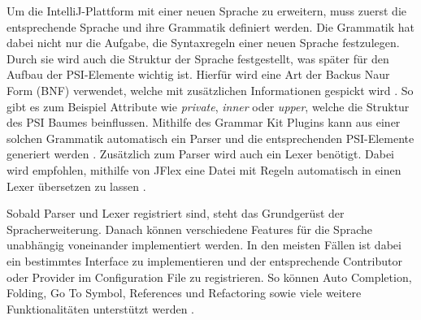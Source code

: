   Um die IntelliJ-Plattform mit einer neuen Sprache zu erweitern, muss zuerst die entsprechende
  Sprache und ihre Grammatik definiert werden. Die Grammatik hat dabei nicht nur die Aufgabe, die 
  Syntaxregeln einer neuen Sprache festzulegen. Durch sie wird auch die Struktur der Sprache festgestellt,
  was später für den Aufbau der PSI-Elemente wichtig ist. Hierfür wird eine Art der Backus Naur Form (BNF)
  verwendet, welche mit zusätzlichen Informationen gespickt wird \cite{mccracken2003backus,GrammarKit}. 
  So gibt es zum Beispiel Attribute
  wie \emph{private}, \emph{inner} oder \emph{upper}, welche die Struktur des PSI Baumes beinflussen. Mithilfe des Grammar Kit Plugins
  kann aus einer solchen Grammatik automatisch ein Parser und die entsprechenden PSI-Elemente generiert werden
  \cite{IntelliJPlatformSDKLanguageTutorialGrammar}. 
  Zusätzlich zum Parser wird auch ein Lexer benötigt. Dabei wird empfohlen, mithilfe von JFlex
  eine Datei mit Regeln automatisch in einen Lexer übersetzen zu lassen 
  \cite{JFlex,KleinJFlexManual,IntelliJPlatformSDKLanguageTutorialLexer}.

  Sobald Parser und Lexer registriert sind, steht das Grundgerüst der Spracherweiterung. Danach können
  verschiedene Features für die Sprache unabhängig voneinander implementiert werden. In den meisten
  Fällen ist dabei ein bestimmtes Interface zu implementieren und der entsprechende Contributor oder
  Provider im Configuration File zu registrieren. So können Auto Completion, Folding, Go To Symbol,
  References und Refactoring sowie viele weitere Funktionalitäten unterstützt werden
  \cite{IntelliJPlatformSDKCustomLanguageSupport,IntelliJPlatformSDKLanguageTutorial}.

